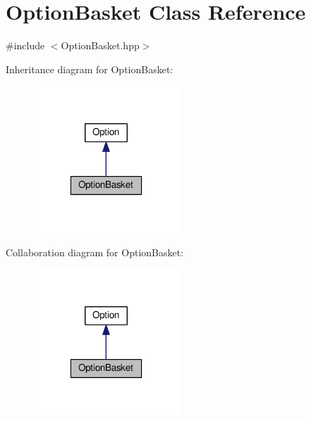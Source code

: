 \hypertarget{classOptionBasket}{\section{Option\-Basket Class Reference}
\label{classOptionBasket}
}


{\ttfamily \#include $<$Option\-Basket.\-hpp$>$}



Inheritance diagram for Option\-Basket\-:\nopagebreak
\begin{figure}[H]
\begin{center}
\leavevmode
\includegraphics[width=154pt]{classOptionBasket__inherit__graph}
\end{center}
\end{figure}


Collaboration diagram for Option\-Basket\-:\nopagebreak
\begin{figure}[H]
\begin{center}
\leavevmode
\includegraphics[width=154pt]{classOptionBasket__coll__graph}
\end{center}
\end{figure}

